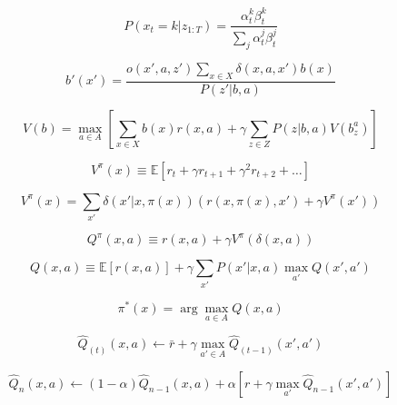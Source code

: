 \documentclass{article}
\begin{document}
\begin{equation}
    P(x_t = k | z_{1:T}) = \frac{\alpha_t^k \beta_t^k}{\sum_j \alpha_t^j \beta_t^j}
\end{equation}

\begin{equation}
    b'(x') = \frac{o(x', a, z') \sum_{x \in X} \delta(x, a, x') b(x)}{P(z' | b, a)}
\end{equation}

\begin{equation}
    V(b) = \max_{a \in A} \left[ \sum_{x \in X} b(x) r(x, a) + \gamma \sum_{z \in Z} P(z|b, a) V(b_z^a) \right]
\end{equation}

\begin{equation}
    V^\pi(x) \equiv \mathbb{E}[r_t + \gamma r_{t+1} + \gamma^2 r_{t+2} + \dots]
\end{equation}

\begin{equation}
    V^\pi(x) = \sum_{x'} \delta(x' | x, \pi(x)) \left( r(x, \pi(x), x') + \gamma V^\pi(x') \right)
\end{equation}

\begin{equation}
    Q^\pi(x, a) \equiv r(x, a) + \gamma V^\pi(\delta(x, a))
\end{equation}

\begin{equation}
    Q(x, a) \equiv \mathbb{E}[r(x, a)] + \gamma \sum_{x'} P(x' | x, a) \max_{a'} Q(x', a')
\end{equation}

\begin{equation}
    \pi^*(x) = \arg\max_{a \in A} Q(x, a)
\end{equation}

\begin{equation}
    \hat{Q}_{(t)}(x, a) \leftarrow \bar{r} + \gamma \max_{a' \in A} \hat{Q}_{(t-1)}(x', a')
\end{equation}

\begin{equation}
    \hat{Q}_n(x, a) \leftarrow (1 - \alpha)\hat{Q}_{n-1}(x, a) + \alpha \left[ r + \gamma \max_{a'} \hat{Q}_{n-1}(x', a') \right]
\end{equation}
\end{document}
